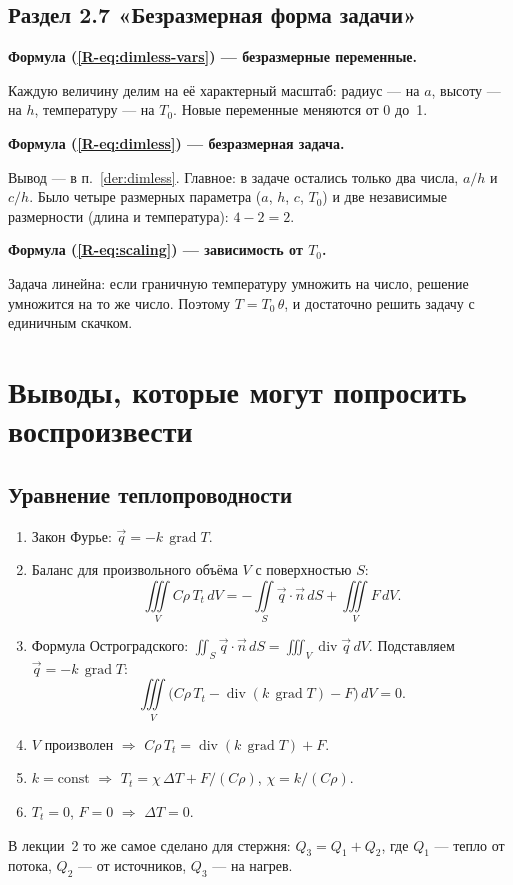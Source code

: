 \documentclass[a4paper,12pt]{article}
\newcommand{\rf}[1]{(\ref*{R-#1})}
\DeclareMathOperator{\Div}{div}
\DeclareMathOperator{\Grad}{grad}
\newcommand{\fhead}[2]{\par\medskip\textbf{Формула #1 — #2.}\par\nopagebreak[4]}
\begin{document}
\subsection{Раздел 2.7 «Безразмерная форма задачи»}

\fhead{\rf{eq:dimless-vars}}{безразмерные переменные}
Каждую величину делим на её характерный масштаб: радиус — на $a$, высоту —
на $h$, температуру — на $T_0$. Новые переменные меняются от 0 до~1.

\fhead{\rf{eq:dimless}}{безразмерная задача}
Вывод — в п.~\ref{der:dimless}. Главное: в задаче остались только два
числа, $a/h$ и $c/h$. Было четыре размерных параметра ($a$, $h$, $c$, $T_0$)
и две независимые размерности (длина и температура): $4-2=2$.

\fhead{\rf{eq:scaling}}{зависимость от $T_0$}
Задача линейна: если граничную температуру умножить на число, решение
умножится на то же число. Поэтому $T=T_0\,\theta$, и достаточно решить
задачу с единичным скачком.

\section{Выводы, которые могут попросить воспроизвести}
\label{sec:derivations}

\subsection{Уравнение теплопроводности}
\label{der:heat}
\begin{enumerate}
  \item Закон Фурье: $\vec q=-k\,\Grad T$.
  \item Баланс для произвольного объёма $V$ с поверхностью $S$:
  \[
  \iiint\limits_V C\rho\,T_t\,dV=-\iint\limits_S\vec q\cdot\vec n\,dS+\iiint\limits_V F\,dV .
  \]
  \item Формула Остроградского:
  $\iint_S\vec q\cdot\vec n\,dS=\iiint_V\Div\vec q\,dV$. Подставляем
  $\vec q=-k\,\Grad T$:
  \[
  \iiint\limits_V\bigl(C\rho\,T_t-\Div(k\,\Grad T)-F\bigr)\,dV=0 .
  \]
  \item $V$ произволен $\Rightarrow$ $C\rho\,T_t=\Div(k\,\Grad T)+F$.
  \item $k=\mathrm{const}$ $\Rightarrow$ $T_t=\chi\,\Delta T+F/(C\rho)$,
  $\chi=k/(C\rho)$.
  \item $T_t=0$, $F=0$ $\Rightarrow$ $\Delta T=0$.
\end{enumerate}
В лекции~2 то же самое сделано для стержня: $Q_3=Q_1+Q_2$, где $Q_1$ —
тепло от потока, $Q_2$ — от источников, $Q_3$ — на нагрев.
\end{document}

